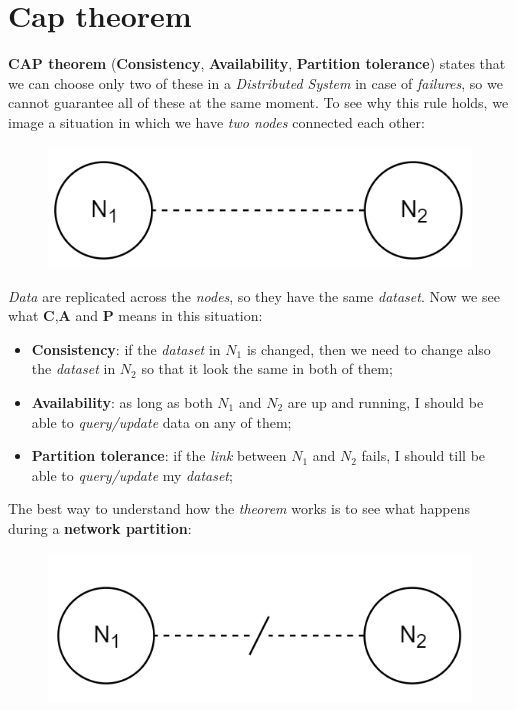 \documentclass{article}
\begin{document}
\section{Cap theorem}
\textbf{CAP theorem} (\textbf{Consistency}, \textbf{Availability}, \textbf{Partition tolerance}) states that we can choose only two of these in a \emph{Distributed System} in case of \emph{failures}, so we cannot guarantee all of these at the same moment. To see why this rule holds, we image a situation in which we have \emph{two nodes} connected each other: 
\begin{figure}[H]
  \centering
  \includegraphics[scale=0.95]{cattura76.png}
\end{figure}
\emph{Data} are replicated across the \emph{nodes}, so they have the same \emph{dataset}. Now we see what \textbf{C},\textbf{A} and \textbf{P} means in this situation:
\begin{itemize}
\item \textbf{Consistency}: if the \emph{dataset} in $N_1$ is changed, then we need to change also the \emph{dataset} in $N_2$ so that it look the same in both of them;
\item \textbf{Availability}: as long as both $N_1$ and $N_2$ are up and running, I should be able to \emph{query/update} data on any of them;
\item \textbf{Partition tolerance}: if the \emph{link} between $N_1$ and $N_2$ fails, I should till be able to \emph{query/update} my \emph{dataset};
\end{itemize}
The best way to understand how the \emph{theorem} works is to see what happens during a \textbf{network partition}:
\begin{figure}[H]
  \centering
  \includegraphics[scale=0.95]{cattura77.png}
\end{figure}
\end{document}
